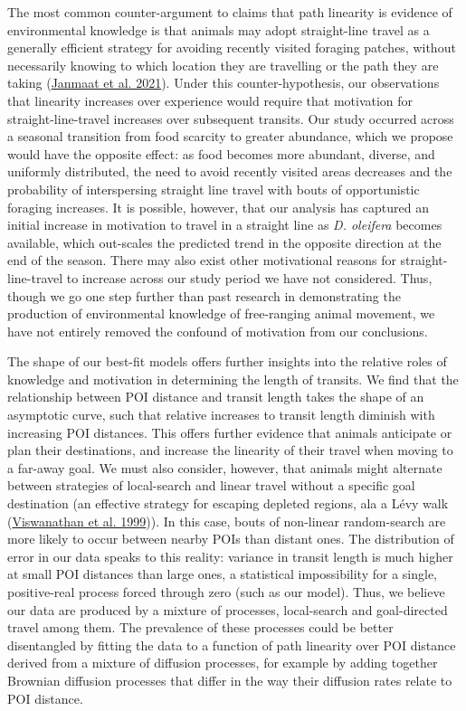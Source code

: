 \documentclass[twoside,12pt,final]{ucthesis-CA2012}
\begin{document}
\begin{ucmainmatter}
The most common counter-argument to claims that path linearity is evidence of environmental knowledge is that animals may adopt straight-line travel as a generally efficient strategy for avoiding recently visited foraging patches, without necessarily knowing to which location they are travelling or the path they are taking (\protect\hyperlink{ref-janmaat2021}{Janmaat et al. 2021}). Under this counter-hypothesis, our observations that linearity increases over experience would require that motivation for straight-line-travel increases over subsequent transits. Our study occurred across a seasonal transition from food scarcity to greater abundance, which we propose would have the opposite effect: as food becomes more abundant, diverse, and uniformly distributed, the need to avoid recently visited areas decreases and the probability of interspersing straight line travel with bouts of opportunistic foraging increases. It is possible, however, that our analysis has captured an initial increase in motivation to travel in a straight line as \emph{D. oleifera} becomes available, which out-scales the predicted trend in the opposite direction at the end of the season. There may also exist other motivational reasons for straight-line-travel to increase across our study period we have not considered. Thus, though we go one step further than past research in demonstrating the production of environmental knowledge of free-ranging animal movement, we have not entirely removed the confound of motivation from our conclusions.

The shape of our best-fit models offers further insights into the relative roles of knowledge and motivation in determining the length of transits. We find that the relationship between POI distance and transit length takes the shape of an asymptotic curve, such that relative increases to transit length diminish with increasing POI distances. This offers further evidence that animals anticipate or plan their destinations, and increase the linearity of their travel when moving to a far-away goal. We must also consider, however, that animals might alternate between strategies of local-search and linear travel without a specific goal destination (an effective strategy for escaping depleted regions, ala a Lévy walk (\protect\hyperlink{ref-viswanathan1999}{Viswanathan et al. 1999})). In this case, bouts of non-linear random-search are more likely to occur between nearby POIs than distant ones. The distribution of error in our data speaks to this reality: variance in transit length is much higher at small POI distances than large ones, a statistical impossibility for a single, positive-real process forced through zero (such as our model). Thus, we believe our data are produced by a mixture of processes, local-search and goal-directed travel among them. The prevalence of these processes could be better disentangled by fitting the data to a function of path linearity over POI distance derived from a mixture of diffusion processes, for example by adding together Brownian diffusion processes that differ in the way their diffusion rates relate to POI distance.


\end{ucmainmatter}
\end{document}
